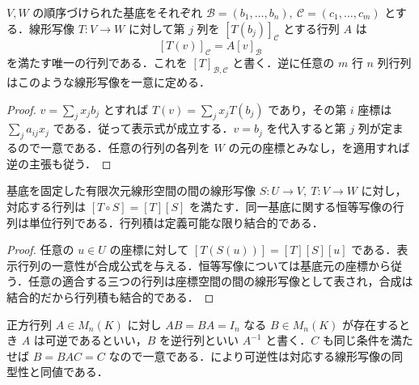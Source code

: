 \begin{prop}[線形写像の行列表示]
$V,W$ の順序づけられた基底をそれぞれ $\mathcal B=(b_1,\ldots,b_n),\ \mathcal C=(c_1,\ldots,c_m)$ とする．線形写像 $T:V\to W$ に対して第 $j$ 列を $[T(b_j)]_{\mathcal C}$ とする行列 $A$ は
\[
 [T(v)]_{\mathcal C}=A[v]_{\mathcal B}
\]
を満たす唯一の行列である．これを $[T]_{\mathcal B,\mathcal C}$ と書く．逆に任意の $m$ 行 $n$ 列行列はこのような線形写像を一意に定める．
\end{prop}
\begin{proof}
$v=\sum_j x_jb_j$ とすれば $T(v)=\sum_j x_jT(b_j)$ であり，その第 $i$ 座標は $\sum_j a_{ij}x_j$ である．従って表示式が成立する．$v=b_j$ を代入すると第 $j$ 列が定まるので一意である．任意の行列の各列を $W$ の元の座標とみなし，を適用すれば逆の主張も従う．
\end{proof}
\begin{prop}[行列積と合成]
基底を固定した有限次元線形空間の間の線形写像 $S:U\to V,\ T:V\to W$ に対し，対応する行列は $[T\circ S]=[T][S]$ を満たす．同一基底に関する恒等写像の行列は単位行列である．行列積は定義可能な限り結合的である．
\end{prop}
\begin{proof}
任意の $u\in U$ の座標に対して $[T(S(u))]=[T][S][u]$ である．表示行列の一意性が合成公式を与える．恒等写像については基底元の座標から従う．任意の適合する三つの行列は座標空間の間の線形写像として表され，合成は結合的だから行列積も結合的である．
\end{proof}
\begin{defn}[逆行列]
正方行列 $A\in M_n(K)$ に対し $AB=BA=I_n$ なる $B\in M_n(K)$ が存在するとき $A$ は可逆であるといい，$B$ を逆行列といい $A^{-1}$ と書く．$C$ も同じ条件を満たせば $B=BAC=C$ なので一意である．により可逆性は対応する線形写像の同型性と同値である．
\end{defn}
